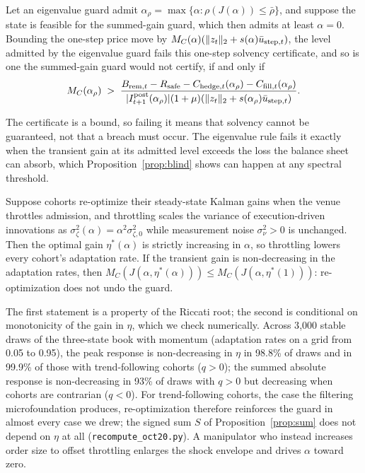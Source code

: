 \begin{proposition}\label{prop:dominance}
Let an eigenvalue guard admit $\alpha_\rho=\max\{\alpha:\rho(J(\alpha))\le\bar\rho\}$, and suppose the state is feasible for the summed-gain guard, which then admits at least $\alpha=0$. Bounding the one-step price move by $M_C(\alpha)(\|z_t\|_2+s(\alpha)\bar u_{{\rm step},t})$, the level admitted by the eigenvalue guard fails this one-step solvency certificate, and so is one the summed-gain guard would not certify, if and only if
\[
M_C(\alpha_\rho)\;>\;\frac{B_{{\rm rem},t}-R_{\rm safe}-C_{{\rm hedge},t}(\alpha_\rho)-C_{{\rm fill},t}(\alpha_\rho)}{|I^{\rm post}_{t+1}(\alpha_\rho)|(1+\mu)(\|z_t\|_2+s(\alpha_\rho)\bar u_{{\rm step},t})} .
\]
\end{proposition}

The certificate is a bound, so failing it means that solvency cannot be guaranteed, not that a breach must occur. The eigenvalue rule fails it exactly when the transient gain at its admitted level exceeds the loss the balance sheet can absorb, which Proposition~\ref{prop:blind} shows can happen at any spectral threshold.

\begin{proposition}\label{prop:lucas}
Suppose cohorts re-optimize their steady-state Kalman gains when the venue throttles admission, and throttling scales the variance of execution-driven innovations as $\sigma_\zeta^2(\alpha)=\alpha^2\sigma_{\zeta,0}^2$ while measurement noise $\sigma_\nu^2>0$ is unchanged. Then the optimal gain $\eta^*(\alpha)$ is strictly increasing in $\alpha$, so throttling lowers every cohort's adaptation rate. If the transient gain is non-decreasing in the adaptation rates, then $M_C(J(\alpha,\eta^*(\alpha)))\le M_C(J(\alpha,\eta^*(1)))$: re-optimization does not undo the guard.
\end{proposition}

The first statement is a property of the Riccati root; the second is conditional on monotonicity of the gain in $\eta$, which we check numerically. Across 3{,}000 stable draws of the three-state book with momentum (adaptation rates on a grid from 0.05 to 0.95), the peak response is non-decreasing in $\eta$ in 98.8\% of draws and in 99.9\% of those with trend-following cohorts ($q>0$); the summed absolute response is non-decreasing in 93\% of draws with $q>0$ but decreasing when cohorts are contrarian ($q<0$). For trend-following cohorts, the case the filtering microfoundation produces, re-optimization therefore reinforces the guard in almost every case we drew; the signed sum $S$ of Proposition~\ref{prop:sum} does not depend on $\eta$ at all (\texttt{recompute\_oct20.py}). A manipulator who instead increases order size to offset throttling enlarges the shock envelope and drives $\alpha$ toward zero.
